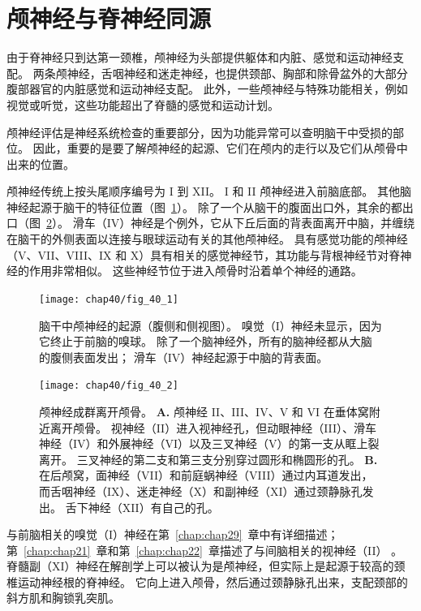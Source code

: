 \section{颅神经与脊神经同源}

由于脊神经只到达第一颈椎，颅神经为头部提供躯体和内脏、感觉和运动神经支配。
两条颅神经，舌咽神经和迷走神经，也提供颈部、胸部和除骨盆外的大部分腹部器官的内脏感觉和运动神经支配。
此外，一些颅神经与特殊功能相关，例如视觉或听觉，这些功能超出了脊髓的感觉和运动计划。


颅神经评估是神经系统检查的重要部分，因为功能异常可以查明脑干中受损的部位。
因此，重要的是要了解颅神经的起源、它们在颅内的走行以及它们从颅骨中出来的位置。


颅神经传统上按头尾顺序编号为 I 到 XII。
I 和 II 颅神经进入前脑底部。
其他脑神经起源于脑干的特征位置（图~\ref{fig:40_1}）。
除了一个从脑干的腹面出口外，其余的都出口（图~\ref{fig:40_2}）。
滑车（IV）神经是个例外，它从下丘后面的背表面离开中脑，并缠绕在脑干的外侧表面以连接与眼球运动有关的其他颅神经。
具有感觉功能的颅神经（V、VII、VIII、IX 和 X）具有相关的感觉神经节，其功能与背根神经节对脊神经的作用非常相似。
这些神经节位于进入颅骨时沿着单个神经的通路。


\begin{figure}[htbp]
	\centering
	\texttt{[image: chap40/fig\_40\_1]}
	\caption{脑干中颅神经的起源（腹侧和侧视图）。
		嗅觉（I）神经未显示，因为它终止于前脑的嗅球。 除了一个脑神经外，所有的脑神经都从大脑的腹侧表面发出； 滑车（IV）神经起源于中脑的背表面。}
	\label{fig:40_1}
\end{figure}


\begin{figure}[htbp]
	\centering
	\texttt{[image: chap40/fig\_40\_2]}
	\caption{颅神经成群离开颅骨。
		\textbf{A.} 颅神经 II、III、IV、V 和 VI 在垂体窝附近离开颅骨。
		视神经（II）进入视神经孔，但动眼神经（III）、滑车神经（IV）和外展神经（VI）以及三叉神经（V）的第一支从眶上裂离开。
		三叉神经的第二支和第三支分别穿过圆形和椭圆形的孔。
		\textbf{B.} 在后颅窝，面神经（VII）和前庭蜗神经（VIII）通过内耳道发出，而舌咽神经（IX）、迷走神经（X）和副神经（XI）通过颈静脉孔发出。
		舌下神经（XII）有自己的孔。}
	\label{fig:40_2}
\end{figure}



与前脑相关的嗅觉（I）神经在第~\ref{chap:chap29}~章中有详细描述；
第~\ref{chap:chap21}~章和第~\ref{chap:chap22}~章描述了与间脑相关的视神经（II） 。
脊髓副（XI）神经在解剖学上可以被认为是颅神经，但实际上是起源于较高的颈椎运动神经根的脊神经。
它向上进入颅骨，然后通过颈静脉孔出来，支配颈部的斜方肌和胸锁乳突肌。



